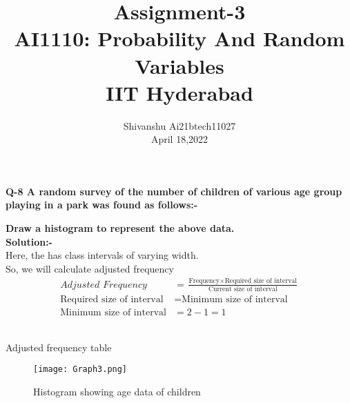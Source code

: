 \documentclass[12pt]{IEEEtran}
\title{\textbf{Assignment-3}\\ \large AI1110: Probability And Random Variables\\ IIT Hyderabad}
\author{Shivanshu  Ai21btech11027\\ April 18,2022}
\begin{document}
    \maketitle
    \textbf{Q-8 A random survey of the number of children of various age group playing in a park was found as follows:-}\\
   
    \begin{center}
        
    \end{center}
    \textbf{Draw a histogram to represent the above data.}\\
    
    \textbf{Solution:-}\\
    Here, the has class intervals of varying width.\\
    So, we will calculate adjusted frequency\\

    \begin{align}
        \textit{Adjusted Frequency} &= \tfrac{ \text{Frequency} \times \text{Required size of interval}}{\text{Current size of interval}}\\
        \text{Required size of interval} &= \text{Minimum size of interval}\\
        \text{Minimum size of interval} &= 2-1 =1
    \end{align}

    \begin{center}
        
        \label{table:table_2}
        \vspace{5mm}\\
        \caption{Adjusted frequency table}
    \end{center}
    
    \begin{figure}[h]
        \begin{center}
        \texttt{[image: Graph3.png]}
        \caption{Histogram showing age data of children}
        \label{fig.}
        \end{center}
    \end{figure}
 
\end{document}
